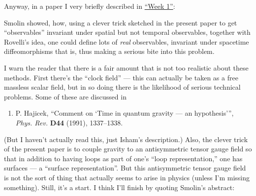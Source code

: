 \documentclass{article}
\def\tightlist{}
\renewcommand{\texttt}[1]{%
  \begingroup
  \ttfamily
  \begingroup\lccode`~=`/\lowercase{\endgroup\def~}{/\discretionary{}{}{}}%
  \begingroup\lccode`~=`[\lowercase{\endgroup\def~}{[\discretionary{}{}{}}%
  \begingroup\lccode`~=`.\lowercase{\endgroup\def~}{.\discretionary{}{}{}}%
  \catcode`/=\active\catcode`[=\active\catcode`.=\active
  \scantokens{#1\noexpand}%
  \endgroup
}
\begin{document}
Anyway, in a paper I very briefly described in
\protect\hyperlink{week1}{``Week 1''}:
Smolin showed, how, using a clever trick sketched in the present paper
to get ``observables'' invariant under spatial but not temporal
observables, together with Rovelli's idea, one could define lots of \emph{real}
observables, invariant under spacetime diffeomorphisms that is, thus
making a serious bite into this problem.

I warn the reader that there is a fair amount that is not too realistic
about these methods. First there's the ``clock field'' --- this can
actually be taken as a free massless scalar field, but in so doing there
is the likelihood of serious technical problems. Some of these are
discussed in

\begin{enumerate}
\def\labelenumi{\arabic{enumi})}
\setcounter{enumi}{5}
\tightlist
\item
  P. Hajicek, ``Comment on `Time in quantum gravity --- an
  hypothesis''', \emph{Phys. Rev.} \textbf{D44} (1991), 1337--1338.
\end{enumerate}
(But I haven't actually read this, just Isham's description.) Also, the
clever trick of the present paper is to couple gravity to an
antisymmetric tensor gauge field so that in addition to having loops as
part of one's ``loop representation,'' one has surfaces --- a ``surface
representation''. But this antisymmetric tensor gauge field is not the
sort of thing that actually seems to arise in physics (unless I'm
missing something). Still, it's a start. I think I'll finish by quoting
Smolin's abstract:
\end{document}
